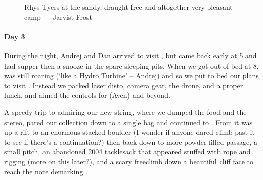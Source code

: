 \begin{figure}[t!]
\checkoddpage \ifoddpage \forcerectofloat \else \forceversofloat \fi
\centering
{}
\caption{Rhys Tyers at the sandy, draught-free and altogether very pleasant \protect{} camp --- Jarvist Frost}
\label{rhys red cow}
\end{figure}


\paragraph{Day 3}
During the night, Andrej and Dan arrived to visit , but came back early at 5 and had supper then a snooze in the spare sleeping pits. When we got out of bed at 8,  was still roaring (`like a Hydro Turbine' -- Andrej) and so we put to bed our plans to visit . Instead we packed laser disto, camera gear, the drone, and a proper lunch, and aimed the controls for  (Aven) and beyond.

A speedy trip to  admiring our new string, where we dumped the food and the stereo, pared our collection down to a single bag and continued to .
From  it was up a rift to an enormous stacked boulder (I wonder if anyone dared climb past it to see if there's a continuation?) then back down to more powder-filled passage, a small pitch, an abandoned 2004 tacklesack that appeared stuffed with rope and rigging (more on this later?), and a scary freeclimb down a beautiful cliff face to reach the note demarking .

